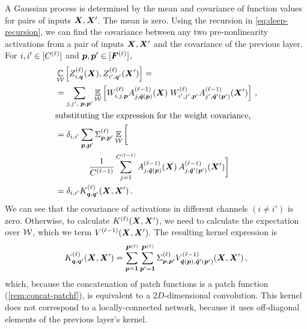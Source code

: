 \documentclass[accepted]{uai2021} %
\newcommand{\layerAsd}[2]{Z^{(#1)}_{#2}(\vX')}
\newcommand{\layerAs}[2]{Z^{(#1)}_{#2}(\vX)}
\newcommand{\layerC}[1]{C^{(#1)}}
\newcommand{\layerNLAsd}[2]{A^{(#1)}_{#2}(\vX')}
\newcommand{\layerNLAs}[2]{A^{(#1)}_{#2}(\vX)}
\newcommand{\layerWs}[1]{W^{(#1)}}
\newcommand{\layersizebase}{\vF}
\newcommand{\layersize}[1]{{\layersizebase^{\bra{#1}}}}
\newcommand{\patchsizebase}{\vP}
\newcommand{\patchsize}[1]{{\patchsizebase^{\bra{#1}}}}
\newcommand{\patchf}[2]{{\tilde#1\bra{#2}}}
\newcommand{\priorWcovs}[1]{\Sigma^{(#1)}}
\newcommand{\chan}{i}
\newcommand{\prevchan}{j}   %
\newcommand{\patch}{\vp}               %
\newcommand{\nextpatch}{\vq}
\newcommand{\covf}[1]{K\ssup{#1}}
\newcommand{\nlinf}[1]{V\ssup{#1}}
\newcommand{\0}{\boldsymbol{0}}
\newcommand{\1}{\boldsymbol{1}}
\newcommand{\crefp}[1]{(\cref{#1})}
\begin{document}
A Gaussian process is determined by the mean and covariance of function values for pairs of inputs ${\bm{X}},{\bm{X}}'$. The mean is zero. Using the recursion in \cref{eq:deep-recursion}, we can find the covariance between any two pre-nonlinearity activations from a pair of inputs ${\bm{X}},{\bm{X}}'$ and the covariance of the previous layer. For $\chan,\chan'\in\countto{\layerC{\ell}}$ and $\patch,\patch'\in\countto{\layersize{\ell}}$,
\begin{align}
  &\Cov_{\gW}\left[\layerAs{\ell}{\chan,\nextpatch},\layerAsd{\ell}{\chan',\nextpatch'}\right] = \nonumber\\
  &=\sum_{\prevchan,\prevchan',\;\patch,\patch'} \Expect{\gW}{
    \layerWs{\ell}_{\chan,\prevchan,\patch}\layerNLAs{\ell-1}{\prevchan,\patchf{\nextpatch}{\patch}}\; \layerWs{\ell}_{\chan',\prevchan',\patch'}\layerNLAsd{\ell-1}{\prevchan',\patchf{\nextpatch'}{\patch'}}}\,, \nonumber \\
  \intertext{substituting the expression for the weight covariance,}
  &= \delta_{\chan,\chan'} \sum_{\patch,\patch'}
    \priorWcovs{\ell}_{\patch,\patch'}
    \E_{\gW} \bigg[\nonumber\\
  &\hspace{4em}
 \frac{1}{\layerC{\ell-1}}\sum_{\prevchan=1}^{\layerC{\ell-1}}
    \layerNLAs{\ell-1}{\prevchan,\patchf{\nextpatch}{\patch}}\,
    \layerNLAsd{\ell-1}{\prevchan,\patchf{\nextpatch'}{\patch'}}
    \bigg] \nonumber \\
  &= \delta_{\chan,\chan'} \covf{\ell}_{\nextpatch,\nextpatch'}\bra{\mX,\mX'}\,.\label{eq:kernel-recursion}
\end{align}
We can see that the covariance of activations in different channels
$(\chan\ne\chan')$ is zero. Otherwise, to calculate
$\covf{\ell}\bra{\mX,\mX'}$, we need to calculate the
expectation over ${\mathcal{W}}$, which we term $\nlinf{\ell-1}\bra{\mX,\mX'}.$ The resulting kernel expression is
\begin{equation}
  \covf{\ell}_{\nextpatch,\nextpatch'}\bra{\mX,\mX'} = \sum_{\patch=\1}^{{\patchsize{\ell}}}
  \sum_{\patch'=\1}^{{\patchsize{\ell}}} \priorWcovs{\ell}_{\patch,\patch'}
  \nlinf{\ell-1}_{\patchf{\nextpatch}{\patch},\patchf{\nextpatch'}{\patch'}}\bra{\mX,\mX'}\,,
  \label{eq:cnn-kernel-recursive}
\end{equation}
which, because the concatenation of patch functions is a patch function \crefp{rem:concat-patchf}, is equivalent to a $2D$-dimensional convolution. This kernel does not correspond to a locally-connected network, because it uses off-diagonal elements of the previous layer's kernel.
\end{document}
